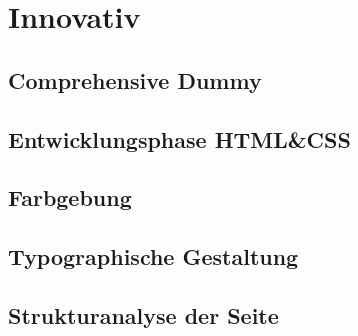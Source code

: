 \section{Innovativ}

	\subsection{Comprehensive Dummy}

	\subsection{Entwicklungsphase HTML\&CSS}

	\subsection{Farbgebung}

	\subsection{Typographische Gestaltung}

	\subsection{Strukturanalyse der Seite}